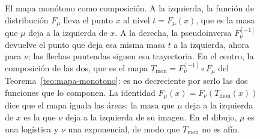 \documentclass[12pt, a4paper]{amsbook}
\theoremstyle{remark}
\theoremstyle{definition}
\numberwithin{section}{chapter}
\numberwithin{subsection}{section}
\numberwithin{equation}{section}
\numberwithin{figure}{chapter}
\begin{document}
\begin{figure}[ht]
\caption{El mapa monótono como composición. A la izquierda, la función de
distribución $F_\mu$ lleva el punto $x$ al nivel $t=F_\mu(x)$, que es la masa
que $\mu$ deja a la izquierda de $x$. A la derecha, la pseudoinversa
$F_\nu^{[-1]}$ devuelve el punto que deja esa misma masa $t$ a la izquierda,
ahora para $\nu$; las flechas punteadas siguen esa trayectoria. En el centro,
la composición de las dos, que es el mapa
$T_{\mathrm{mon}}=F_\nu^{[-1]}\circ F_\mu$ del
Teorema~\ref{teo:mapa-monotono}: es no decreciente por serlo las dos
funciones que lo componen. La identidad
$F_\mu(x)=F_\nu(T_{\mathrm{mon}}(x))$ dice que el mapa iguala las áreas: la
masa que $\mu$ deja a la izquierda de $x$ es la que $\nu$ deja a la izquierda
de su imagen. En el dibujo, $\mu$ es una logística y $\nu$ una exponencial,
de modo que $T_{\mathrm{mon}}$ no es afín.}
\label{fig.mapa.monotono}
\end{figure}
\end{document}

